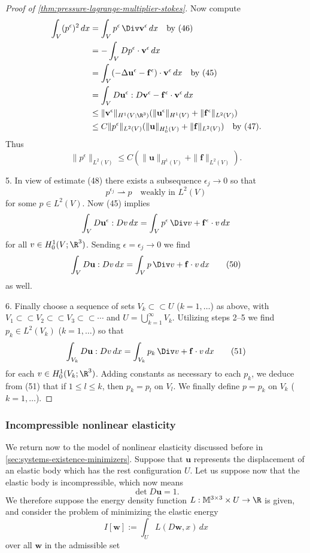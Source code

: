 \begin{proof}[Proof of \cref{thm:pressure-lagrange-multiplier-stokes}]
Now compute
\[
\begin{aligned}
\int_V (p^\epsilon)^2\, dx &= \int_V p^\epsilon\, \Div \mathbf{v}^\epsilon\, dx \quad \text{by (46)} \\
&= -\int_V Dp^\epsilon \cdot \mathbf{v}^\epsilon\, dx \\
&= \int_V (-\Delta \mathbf{u}^\epsilon - \mathbf{f}^\epsilon) \cdot \mathbf{v}^\epsilon\, dx \quad \text{by (45)} \\
&= \int_V D\mathbf{u}^\epsilon : D\mathbf{v}^\epsilon - \mathbf{f}^\epsilon \cdot \mathbf{v}^\epsilon\, dx \\
&\leq \|\mathbf{v}^\epsilon\|_{H^1(V;\R^3)}(\|\mathbf{u}^\epsilon\|_{H^1(V)} + \|\mathbf{f}^\epsilon\|_{L^2(V)}) \\
&\leq C\|p^\epsilon\|_{L^2(V)}(\|\mathbf{u}\|_{H^1_0(V)} + \|\mathbf{f}\|_{L^2(V)}) \quad \text{by (47)}.
\end{aligned}
\]
Thus
\[
\|p^\epsilon\|_{L^2(V)} \leq C\left(\|\mathbf{u}\|_{H^1(V)} + \|\mathbf{f}\|_{L^2(V)}\right).
\tag{48}
\]

5. In view of estimate (48) there exists a subsequence $\epsilon_j \to 0$ so that
\[
p^{\epsilon_j} \rightharpoonup p \quad \text{weakly in } L^2(V)
\tag{49}
\]
for some $p \in L^2(V)$. Now (45) implies
\[
\int_V D\mathbf{u}^\epsilon : Dv\, dx = \int_V p^\epsilon\, \Div v + \mathbf{f}^\epsilon \cdot v\, dx
\]
for all $v \in H_0^1(V;\R^3)$. Sending $\epsilon = \epsilon_j \to 0$ we find
\[
\int_V D\mathbf{u} : Dv\, dx = \int_V p\, \Div v + \mathbf{f} \cdot v\, dx
\tag{50}
\]
as well.

6. Finally choose a sequence of sets $V_k \subset\subset U$ ($k = 1, \ldots$) as above, with $V_1 \subset\subset V_2 \subset\subset V_3 \subset\subset \cdots$ and $U = \bigcup_{k=1}^\infty V_k$. Utilizing steps 2--5 we find $p_k \in L^2(V_k)$ ($k = 1, \ldots$) so that
\[
\int_{V_k} D\mathbf{u} : Dv\, dx = \int_{V_k} p_k\, \Div v + \mathbf{f} \cdot v\, dx
\tag{51}
\]
for each $v \in H_0^1(V_k;\R^3)$. Adding constants as necessary to each $p_k$, we deduce from (51) that if $1 \leq l \leq k$, then $p_k = p_l$ on $V_l$. We finally define $p = p_k$ on $V_k$ ($k = 1, \ldots$).
\end{proof}

\subsubsection{Incompressible nonlinear elasticity}

We return now to the model of nonlinear elasticity discussed before in \cref{sec:systems-existence-minimizers}. Suppose that $\mathbf{u}$ represents the displacement of an elastic body which has the rest configuration $U$. Let us suppose now that the elastic body is incompressible, which now means
\[
\det D\mathbf{u} = 1.
\]
We therefore suppose the energy density function $L : \mathbb{M}^{3 \times 3} \times U \to \R$ is given, and consider the problem of minimizing the elastic energy
\[
I[\mathbf{w}] := \int_U L(D\mathbf{w}, x)\, dx
\]
over all $\mathbf{w}$ in the admissible set

